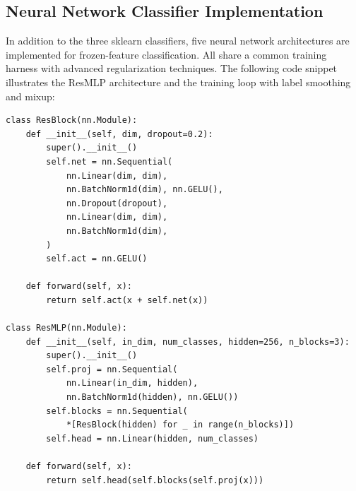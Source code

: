 \subsection{Neural Network Classifier Implementation}

In addition to the three sklearn classifiers, five neural network architectures are implemented for frozen-feature classification. All share a common training harness with advanced regularization techniques. The following code snippet illustrates the ResMLP architecture and the training loop with label smoothing and mixup:

\begin{lstlisting}[caption={ResMLP architecture with residual blocks.}, label={lst:resmlp_arch}]
class ResBlock(nn.Module):
    def __init__(self, dim, dropout=0.2):
        super().__init__()
        self.net = nn.Sequential(
            nn.Linear(dim, dim),
            nn.BatchNorm1d(dim), nn.GELU(),
            nn.Dropout(dropout),
            nn.Linear(dim, dim),
            nn.BatchNorm1d(dim),
        )
        self.act = nn.GELU()

    def forward(self, x):
        return self.act(x + self.net(x))

class ResMLP(nn.Module):
    def __init__(self, in_dim, num_classes, hidden=256, n_blocks=3):
        super().__init__()
        self.proj = nn.Sequential(
            nn.Linear(in_dim, hidden),
            nn.BatchNorm1d(hidden), nn.GELU())
        self.blocks = nn.Sequential(
            *[ResBlock(hidden) for _ in range(n_blocks)])
        self.head = nn.Linear(hidden, num_classes)

    def forward(self, x):
        return self.head(self.blocks(self.proj(x)))
\end{lstlisting}

